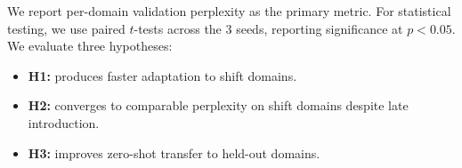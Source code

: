 We report per-domain validation perplexity as the primary metric. For statistical testing, we use paired $t$-tests across the 3 seeds, reporting significance at $p < 0.05$. We evaluate three hypotheses:
\begin{itemize}[leftmargin=*,itemsep=0pt,topsep=0pt]
    \item \textbf{H1:} \dsc produces faster adaptation to shift domains.
    \item \textbf{H2:} \dsc converges to comparable perplexity on shift domains despite late introduction.
    \item \textbf{H3:} \dsc improves zero-shot transfer to held-out domains.
\end{itemize}
